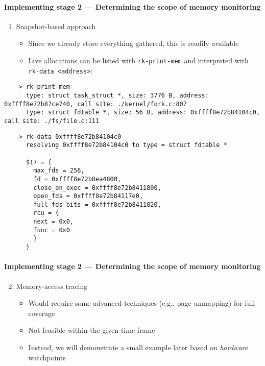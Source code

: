 \documentclass{i20lecture}
\begin{document}
\begin{frame}[fragile]{\insertsection}
  \framesubtitle{Implementing stage 2 --- Determining the scope of memory monitoring}

    \begin{enumerate}
     \item Snapshot-based approach
\pause
     \begin{itemize}
      \item Since we already store everything gathered, this is readily available
\pause
      \item Live allocations can be listed with \lstinline|rk-print-mem| and interpreted with \lstinline|rk-data <address>|:
     \end{itemize}
    \end{enumerate}
    \begin{lstlisting}
    > rk-print-mem
	  type: struct task_struct *, size: 3776 B, address: 0xffff8e72b87ce740, call site: ./kernel/fork.c:807
	  type: struct fdtable *, size: 56 B, address: 0xffff8e72b84104c0, call site: ./fs/file.c:111
    \end{lstlisting}
    \begin{lstlisting}
	> rk-data 0xffff8e72b84104c0
	  resolving 0xffff8e72b84104c0 to type = struct fdtable *

	  $17 = {
	    max_fds = 256,
	    fd = 0xffff8e72b8ea4800,
	    close_on_exec = 0xffff8e72b8411800,
	    open_fds = 0xffff8e72b84117e0,
	    full_fds_bits = 0xffff8e72b8411820,
	    rcu = {
	  	next = 0x0,
	  	func = 0x0
	    }
	  }
    \end{lstlisting}
\end{frame}

\begin{frame}[fragile]{\insertsection}
  \framesubtitle{Implementing stage 2 --- Determining the scope of memory monitoring}

    \begin{enumerate}
     \setcounter{enumi}{1}
     \item Memory-access tracing
\pause
    \begin{itemize}
     \item Would require some advanced techniques (e.g., page unmapping) for full coverage
\pause
    \item Not feasible within the given time frame
\pause
    \item Instead, we will demonstrate a small example later based on \textit{hardware} watchpoints
    \end{itemize}
    \end{enumerate}
\end{frame}
\end{document}
